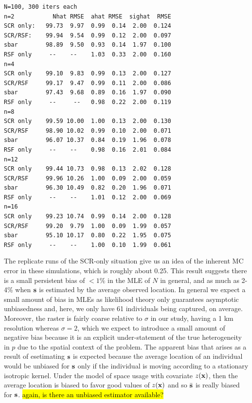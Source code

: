 \begin{verbatim}
N=100, 300 iters each
n=2           Nhat RMSE  ahat RMSE  sighat  RMSE
SCR only:   99.73  9.97  0.99  0.14  2.00  0.124
SCR/RSF:    99.94  9.54  0.99  0.12  2.00  0.097
sbar        98.89  9.50  0.93  0.14  1.97  0.100
RSF only     --    --    1.03  0.33  2.00  0.160
n=4
SCR only    99.10  9.83  0.99  0.13  2.00  0.127
SCR/RSF     99.17  9.47  0.99  0.11  2.00  0.086
sbar        97.43  9.68  0.89  0.16  1.97  0.090
RSF only     --     --   0.98  0.22  2.00  0.119
n=8
SCR only    99.59 10.00  1.00  0.13  2.00  0.130
SCR/RSF     98.90 10.02  0.99  0.10  2.00  0.071
sbar        96.07 10.37  0.84  0.19  1.96  0.078
RSF only     --    --    0.98  0.16  2.01  0.084
n=12
SCR only    99.44 10.73  0.98  0.13  2.02  0.128
SCR/RSF     99.96 10.26  1.00  0.09  2.00  0.059
sbar        96.30 10.49  0.82  0.20  1.96  0.071
RSF only     --    --    1.01  0.12  2.00  0.069
n=16
SCR only    99.23 10.74  0.99  0.14  2.00  0.128
SCR/RSF     99.20  9.79  1.00  0.09  1.99  0.057
sbar        95.10 10.17  0.80  0.22  1.95  0.075
RSF only     --    --    1.00  0.10  1.99  0.061
\end{verbatim}

The replicate runs of the SCR-only situation give us an idea of the
inherent MC error in these simulations, which is roughly about
0.25. This result suggests there is a small persistent bias of $< 1\%$
in the MLE of $N$ in general, and as much as 2-4\% when ${\bf s}$ is
estimated by the average observed location.  In general we expect a
small amount of bias in MLEs as likelihood theory only guarantees
asymptotic unbiasedness and, here, we only have 61 individuals being
captured, on average.  Moreover, the raster is fairly coarse relative
to $\sigma$ in our study, having a 1 km resolution whereas $\sigma =
2$, which we expect to introduce a small amount of negative bias
because it is an explicit under-statement of the true heterogeneity in
$p$ due to the spatial context of the problem.  The apparent bias that
arises as a result of esetimating ${\bf s}$ is expected because the
average location of an individual would be unbiased for ${\bf s}$ only
if the individual is moving according to a stationary isotropic
kernel. Under the model of space usage with covariate $z({\bf x})$,
then the average location is biased to favor good values of $z({\bf
  x})$ and so $\bar{\bf s}$ is really biased for ${\bf s}$. \hl{again,
  is there an unbiased estimator available?}

